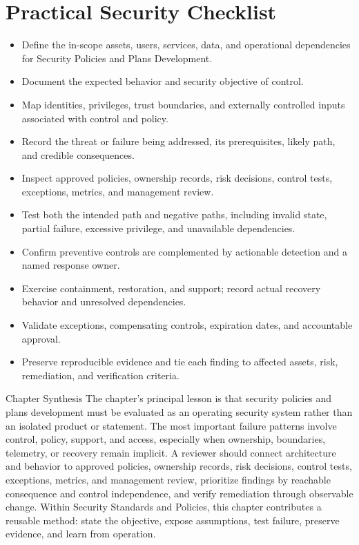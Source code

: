 \documentclass[11pt,letterpaper]{article}
\begin{document}
\section*{Practical Security Checklist}
\begin{itemize}[label=$\square$]
\item Define the in-scope assets, users, services, data, and operational dependencies for Security Policies and Plans Development.
\item Document the expected behavior and security objective of control.
\item Map identities, privileges, trust boundaries, and externally controlled inputs associated with control and policy.
\item Record the threat or failure being addressed, its prerequisites, likely path, and credible consequences.
\item Inspect approved policies, ownership records, risk decisions, control tests, exceptions, metrics, and management review.
\item Test both the intended path and negative paths, including invalid state, partial failure, excessive privilege, and unavailable dependencies.
\item Confirm preventive controls are complemented by actionable detection and a named response owner.
\item Exercise containment, restoration, and support; record actual recovery behavior and unresolved dependencies.
\item Validate exceptions, compensating controls, expiration dates, and accountable approval.
\item Preserve reproducible evidence and tie each finding to affected assets, risk, remediation, and verification criteria.
\end{itemize}
\begin{CornellSummaryBox}{Chapter Synthesis}
The chapter's principal lesson is that security policies and plans development must be evaluated as an operating security system rather than an isolated product or statement. The most important failure patterns involve control, policy, support, and access, especially when ownership, boundaries, telemetry, or recovery remain implicit. A reviewer should connect architecture and behavior to approved policies, ownership records, risk decisions, control tests, exceptions, metrics, and management review, prioritize findings by reachable consequence and control independence, and verify remediation through observable change. Within Security Standards and Policies, this chapter contributes a reusable method: state the objective, expose assumptions, test failure, preserve evidence, and learn from operation.
\end{CornellSummaryBox}
\end{document}
